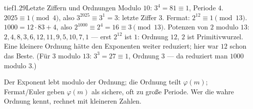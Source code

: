 \begin{loesungkarte}{tief}{1.29}{Letzte Ziffern und Ordnungen}
Modulo $10$: $3^{4} = 81\equiv1$, Periode $4$. $2025\equiv1\pmod4$, also $3^{2025}\equiv3^{1} = 3$: letzte Ziffer $3$.
Fermat: $2^{12}\equiv1\pmod{13}$. $1000 = 12\cdot83 + 4$, also $2^{1000}\equiv2^{4} = 16\equiv3\pmod{13}$.
Potenzen von $2$ modulo $13$: $2, 4, 8, 3, 6, 12, 11, 9, 5, 10, 7, 1$ --- erst $2^{12}$ ist $1$: Ordnung $12$, $2$ ist Primitivwurzel. Eine kleinere Ordnung hätte den Exponenten weiter reduziert; hier war $12$ schon das Beste. (Für $3$ modulo $13$: $3^{3} = 27\equiv1$, Ordnung $3$ --- da reduziert man $1000$ modulo $3$.)
\begin{mitnehmen}\kastentext
Der Exponent lebt modulo der Ordnung; die Ordnung teilt $\varphi(m)$; Fermat/Euler geben $\varphi(m)$ als sichere, oft zu große Periode. Wer die wahre Ordnung kennt, rechnet mit kleineren Zahlen.
\end{mitnehmen}
\end{loesungkarte}

